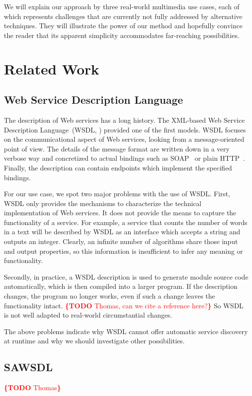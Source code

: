 \documentclass[runningheads,a4paper, twocolumn]{llncs}
\newcommand{\todo}[1]{\noindent\textcolor{red}{{\bf \{TODO} #1{\bf \}}}}
\begin{document}
We will explain our approach by three real-world multimedia use cases, each of which represents challenges that are currently not fully addressed by alternative techniques. They will illustrate the power of our method and hopefully convince the reader that its apparent simplicity accommodates far-reaching possibilities.


\section{Related Work}
\subsection{Web Service Description Language}
The description of Web services has a long history. The XML-based Web Service Description Language~(WSDL, \cite{WSDL1, WSDL2}) provided one of the first models. WSDL focuses on the communicational aspect of Web services, looking from a message-oriented point of view. The details of the message format are written down in a very verbose way and concretized to actual bindings such as SOAP~\cite{SOAP} or plain HTTP~\cite{HTTP}. Finally, the description can contain endpoints which implement the specified bindings.

For our use case, we spot two major problems with the use of WSDL. First, WSDL only provides the mechanisms to characterize the technical implementation of Web services. It does not provide the means to capture the functionality of a service. For example, a service that counts the number of words in a text will be described by WSDL as an interface which accepts a string and outputs an integer. Clearly, an infinite number of algorithms share those input and output properties, so this information is insufficient to infer any meaning or functionality.

Secondly, in practice, a WSDL description is used to generate module source code automatically, which is then compiled into a larger program. If the description changes, the program no longer works, even if such a change leaves the functionality intact. \todo{Thomas, can we cite a reference here?} So WSDL is not well adapted to real-world circumstantial changes.

The above problems indicate why WSDL cannot offer automatic service discovery at runtime and why we should investigate other possibilities.

\subsection{SAWSDL}
\todo{Thomas}
\end{document}
